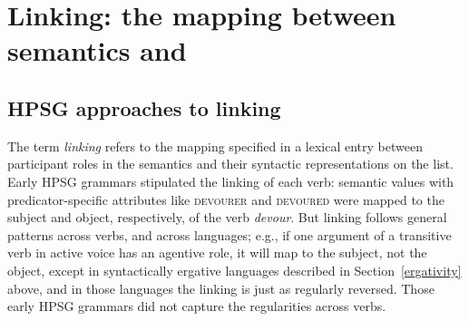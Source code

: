 \documentclass[output=paper
 	        ,biblatex
                ,babelshorthands
                ,newtxmath
                ,draftmode
                ,colorlinks, citecolor=brown
]{langscibook}
\begin{document}
\section{Linking: the mapping between semantics and \argst}
\label{linking-sec}\label{arg-st:sec-linking}

\subsection{HPSG approaches to linking}
\label{arg-st:sec-hpsg-approaches-to-linking}

The term \textit{linking} refers to the mapping specified in a lexical entry between participant
roles in the semantics and their
syntactic representations on the \argst list. Early HPSG grammars stipulated the linking of each
verb: semantic \content values with predicator-specific attributes like \textsc{devourer} and
\textsc{devoured} were mapped to the subject and object, respectively, of the verb \textit{devour}.
But linking follows general patterns across verbs, and across languages; e.g., if one argument of a
transitive verb in active voice has an agentive role, it will map to the subject, not the object,
except in syntactically ergative languages described in Section~\ref{ergativity} above, and in those
languages the linking is just as regularly reversed.  Those early HPSG grammars did not capture the
regularities across verbs.
\end{document}
